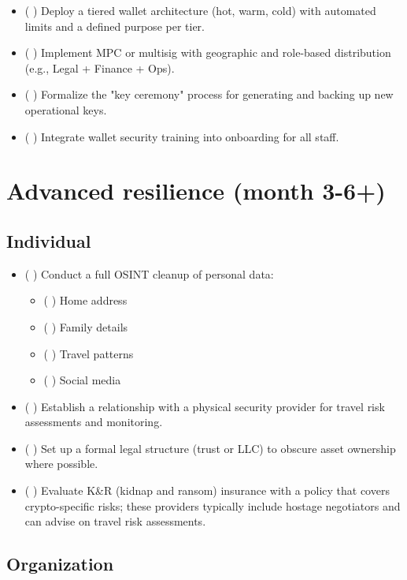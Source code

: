 \begin{itemize}
\tightlist
\item
  ( ) Deploy a tiered wallet architecture (hot, warm, cold) with automated limits and a defined purpose per tier.
\item
  ( ) Implement MPC or multisig with geographic and role-based distribution (e.g., Legal + Finance + Ops).
\item
  ( ) Formalize the "key ceremony" process for generating and backing up new operational keys.
\item
  ( ) Integrate wallet security training into onboarding for all staff.
\end{itemize}

\section{Advanced resilience (month 3-6+)}\label{advanced-resilience-month-3-6}

\subsection{Individual}\label{individual-2}

\begin{itemize}
\tightlist
\item
  ( ) Conduct a full OSINT cleanup of personal data:

  \begin{itemize}
  \tightlist
  \item
    ( ) Home address
  \item
    ( ) Family details
  \item
    ( ) Travel patterns
  \item
    ( ) Social media
  \end{itemize}
\item
  ( ) Establish a relationship with a physical security provider for travel risk assessments and monitoring.
\item
  ( ) Set up a formal legal structure (trust or LLC) to obscure asset ownership where possible.
\item
  ( ) Evaluate K\&R (kidnap and ransom) insurance with a policy that covers crypto-specific risks; these providers typically include hostage negotiators and can advise on travel risk assessments.
\end{itemize}

\subsection{Organization}\label{organization-2}


